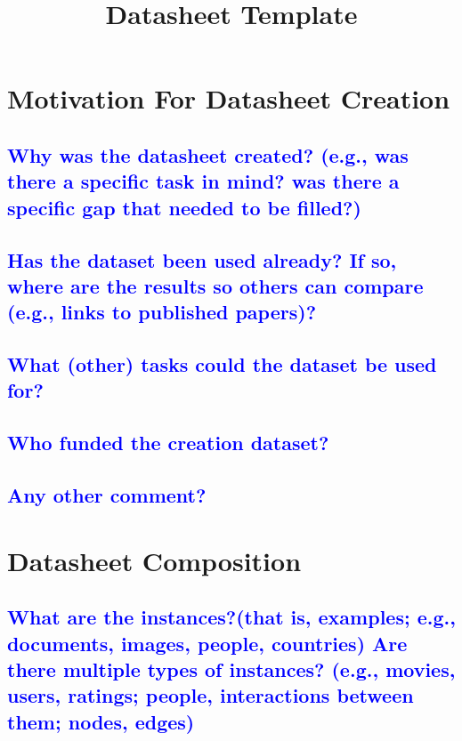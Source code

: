 \documentclass[letterpaper, 10 pt, conference]{ieeeconf}  %
\title{\LARGE \bf
Datasheet Template
}
\begin{document}
\maketitle
\thispagestyle{empty}
\pagestyle{empty}

\section{Motivation For Datasheet Creation}

\textcolor{blue}{\subsection{Why was the datasheet created? (e.g., was there a specific task in mind? was there a specific gap that needed to
be filled?)}}

\lipsum[1]

\textcolor{blue}{\subsection{Has the dataset been used already? If so, where are the results so others can compare
(e.g., links to published papers)?}}

\lipsum[1]

\textcolor{blue}{\subsection{What (other) tasks could the dataset be used for?}}

\lipsum[1]

\textcolor{blue}{\subsection{Who funded the creation dataset?}}

\lipsum[1]

\textcolor{blue}{\subsection{Any other comment?}}

\lipsum[1]

\section{Datasheet Composition}

\textcolor{blue}{\subsection{What are the instances?(that is, examples; e.g., documents, images, people, countries) Are there multiple types
of instances? (e.g., movies, users, ratings; people, interactions between them; nodes, edges)}}
\lipsum[1]
\end{document}

